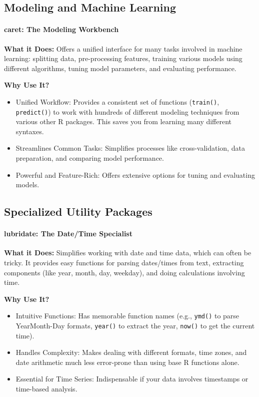 \subsection{Modeling and Machine Learning}

\paragraph{caret: The Modeling Workbench}

\textbf{What it Does:} Offers a unified interface for many tasks involved in machine learning: splitting data, pre-processing features, training various models using different algorithms, tuning model parameters, and evaluating performance.

\textbf{Why Use It?}
\begin{itemize}
    \item Unified Workflow: Provides a consistent set of functions (\texttt{train()}, \texttt{predict()}) to work with hundreds of different modeling techniques from various other R packages. This saves you from learning many different syntaxes.
    \item Streamlines Common Tasks: Simplifies processes like cross-validation, data preparation, and comparing model performance.
    \item Powerful and Feature-Rich: Offers extensive options for tuning and evaluating models.
\end{itemize}

\subsection{Specialized Utility Packages}

\paragraph{lubridate: The Date/Time Specialist}

\textbf{What it Does:} Simplifies working with date and time data, which can often be tricky. It provides easy functions for parsing dates/times from text, extracting components (like year, month, day, weekday), and doing calculations involving time.

\textbf{Why Use It?}
\begin{itemize}
    \item Intuitive Functions: Has memorable function names (e.g., \texttt{ymd()} to parse YearMonth-Day formats, \texttt{year()} to extract the year, \texttt{now()} to get the current time).
    \item Handles Complexity: Makes dealing with different formats, time zones, and date arithmetic much less error-prone than using base R functions alone.
    \item Essential for Time Series: Indispensable if your data involves timestamps or time-based analysis.
\end{itemize}

